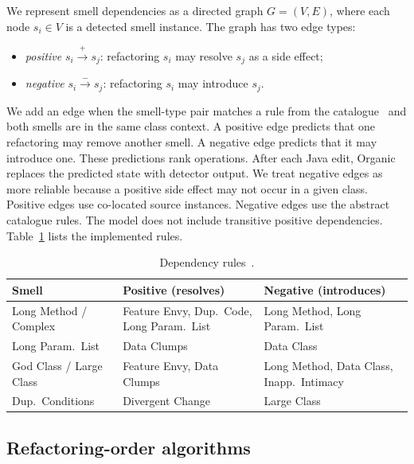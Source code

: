 \documentclass[conference]{IEEEtran}
\begin{document}
We represent smell dependencies as a directed graph $G=(V,E)$, where each node
$s_i \in V$ is a detected smell instance.
The graph has two edge types:
\begin{itemize}
  \item \textit{positive} $s_i \xrightarrow{+} s_j$: refactoring $s_i$
        may resolve $s_j$ as a side effect;
  \item \textit{negative} $s_i \xrightarrow{-} s_j$: refactoring $s_i$
        may introduce $s_j$.
\end{itemize}
We add an edge when the smell-type pair matches a rule from the
catalogue~\cite{markovic2016refaktorovanie} and both smells are in the same
class context. A positive edge predicts that one refactoring may remove another
smell. A negative edge predicts that it may introduce one. These predictions
rank operations. After each Java edit, Organic replaces the predicted state
with detector output. We treat negative edges as more reliable because a
positive side effect may not occur in a given class. Positive edges use
co-located source instances. Negative edges use the abstract catalogue rules.
The model does not include transitive positive dependencies.
Table~\ref{tab:deps} lists the implemented rules.

\begin{table}[tb]
\caption{Dependency rules~\cite{markovic2016refaktorovanie}.}
\label{tab:deps}
\centering
\footnotesize
\setlength{\tabcolsep}{2.5pt}
\begin{tabular}{@{}p{2.0cm}p{2.6cm}p{2.6cm}@{}}
\toprule
\textbf{Smell} & \textbf{Positive (resolves)} &
  \textbf{Negative (introduces)} \\
\midrule
Long Method / Complex &
  Feature Envy, Dup.\ Code, Long Param.\ List &
  Long Method, Long Param.\ List \\
Long Param.\ List &
  Data Clumps &
  Data Class \\
God Class / Large Class &
  Feature Envy, Data Clumps &
  Long Method, Data Class, Inapp.\ Intimacy \\
Dup.\ Conditions &
  Divergent Change &
  Large Class \\
\bottomrule
\end{tabular}
\end{table}

\subsection{Refactoring-order algorithms}
\end{document}
